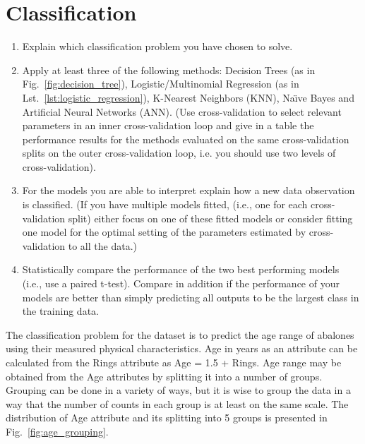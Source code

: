 \documentclass[10pt, paper=a4]{article}
\begin{document}
\section{Classification}
\label{sec:classification}

\begin{enumerate}
\item Explain which classification problem you have chosen to solve.
\item Apply at least three of the following methods: Decision Trees
  (as in Fig.~\ref{fig:decision_tree}), Logistic/Multinomial
  Regression (as in Lst.~\ref{lst:logistic_regression}), K-Nearest
  Neighbors (KNN), Naı̈ve Bayes and Artificial Neural Networks (ANN).
  (Use cross-validation to select relevant parameters in an inner
  cross-validation loop and give in a table the performance results
  for the methods evaluated on the same cross-validation splits on the
  outer cross-validation loop, i.e. you should use two levels of
  cross-validation).
\item For the models you are able to interpret explain how a new data
  observation is classified.  (If you have multiple models fitted,
  (i.e., one for each cross-validation split) either focus on one of
  these fitted models or consider fitting one model for the optimal
  setting of the parameters estimated by cross-validation to all the
  data.)
\item Statistically compare the performance of the two best performing
  models (i.e., use a paired t-test). Compare in addition if the
  performance of your models are better than simply predicting all
  outputs to be the largest class in the training data.
\end{enumerate}


The classification problem for the dataset is to predict the age range
of abalones using their measured physical characteristics.  Age in
years as an attribute can be calculated from the Rings attribute as
Age = 1.5 + Rings.  Age range may be obtained from the Age attributes
by splitting it into a number of groups.  Grouping can be done in a
variety of ways, but it is wise to group the data in a way that the
number of counts in each group is at least on the same scale.  The
distribution of Age attribute and its splitting into 5 groups is
presented in Fig.~\ref{fig:age_grouping}.
\end{document}
